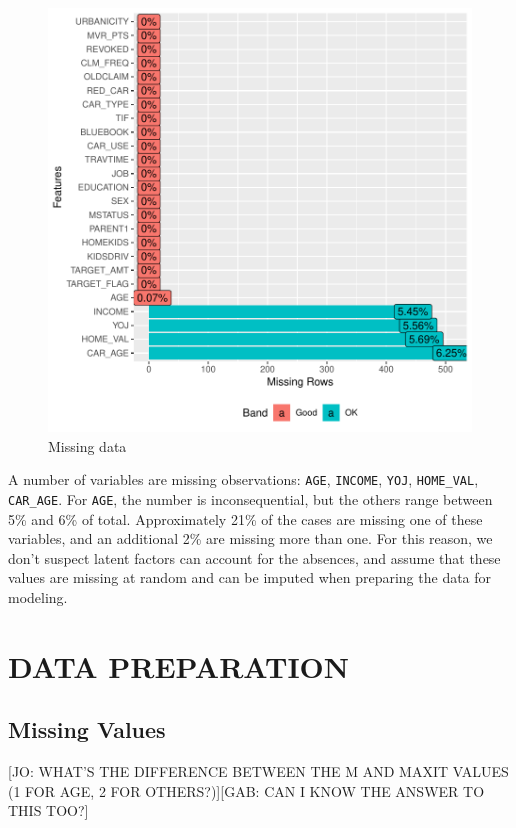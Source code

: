 \documentclass[]{article}
\begin{document}
\begin{figure}
\centering
\includegraphics{proj4_files/figure-latex/f7-1.pdf}
\caption{\label{fig:f7}Missing data}
\end{figure}

A number of variables are missing observations: \texttt{AGE},
\texttt{INCOME}, \texttt{YOJ}, \texttt{HOME\_VAL}, \texttt{CAR\_AGE}.
For \texttt{AGE}, the number is inconsequential, but the others range
between 5\% and 6\% of total. Approximately 21\% of the cases are
missing one of these variables, and an additional 2\% are missing more
than one. For this reason, we don't suspect latent factors can account
for the absences, and assume that these values are missing at random and
can be imputed when preparing the data for modeling.

\newpage

\section{DATA PREPARATION}\label{data-preparation}

\subsection{Missing Values}\label{missing-values}

{[}JO: WHAT'S THE DIFFERENCE BETWEEN THE M AND MAXIT VALUES (1 FOR AGE,
2 FOR OTHERS?){]}{[}GAB: CAN I KNOW THE ANSWER TO THIS TOO?{]}
\end{document}
